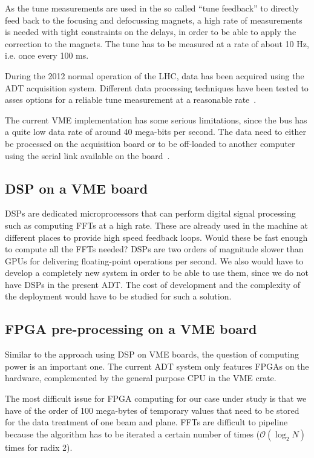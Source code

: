 As the tune measurements are used in the so called ``tune feedback'' to directly feed back to the focusing and defocussing magnets, a high rate of measurements is needed with tight constraints on the delays, in order to be able to apply the correction to the magnets. The \gls{tune} has to be measured at a rate of about 10 Hz, i.e. once every 100 ms.

During the 2012 normal operation of the \gls{LHC}, data has been acquired using the \gls{ADT} acquisition system. Different data processing techniques have been tested to asses options for a reliable \gls{tune} measurement at a reasonable rate~\cite{HofleChamonix12}.

The current \gls{VME} implementation has some serious limitations, since the bus has a quite low data rate of around 40 mega-bits per second. The data need to either be processed on the acquisition board or to be off-loaded to another computer using the serial link available on the board~\cite{Baudrenghien:1124094}.

\subsection{DSP on a VME board}

\Glspl{DSP} are dedicated microprocessors that can perform digital signal processing such as computing \glspl{FFT} at a high rate. These are already used in the machine at different places to provide high speed feedback loops. Would these be fast enough to compute all the \glspl{FFT} needed? \glspl{DSP} are two orders of magnitude slower than \glspl{GPU} for delivering floating-point operations per second. We also would have to develop a completely new system in order to be able to use them, since we do not have \glspl{DSP} in the present \gls{ADT}. The cost of development and the complexity of the deployment would have to be studied for such a solution.

\subsection{FPGA pre-processing on a VME board}

Similar to the approach using \gls{DSP} on VME boards, the question of computing power is an important one. The current \gls{ADT} system only features \glspl{FPGA} on the hardware, complemented by the general purpose \gls{CPU} in the \gls{VME} crate.

The most difficult issue for \gls{FPGA} computing for our case under study is that we have of the order of 100 mega-bytes of temporary values that need to be stored for the data treatment of one beam and plane. \Glspl{FFT} are difficult to pipeline because the algorithm has to be iterated a certain number of times ($\mathcal{O}(\log_{2} N)$ times for radix 2).

